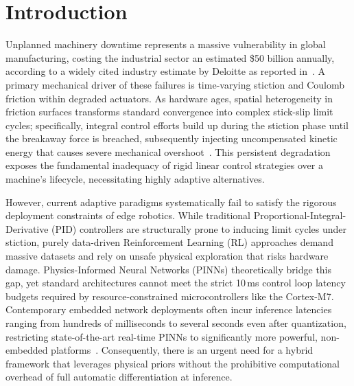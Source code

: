 \documentclass[11pt, a4paper]{article}
\begin{document}
\section{Introduction}

Unplanned machinery downtime represents a massive vulnerability in global
manufacturing, costing the industrial sector an estimated \$50 billion
annually, according to a widely cited industry estimate by Deloitte as
reported in~\citet{ojeda2025predictive}.
A primary mechanical driver of these failures is time-varying stiction and
Coulomb friction within degraded actuators.
As hardware ages, spatial heterogeneity in friction surfaces transforms
standard convergence into complex stick-slip limit cycles; specifically,
integral control efforts build up during the stiction phase until the
breakaway force is breached, subsequently injecting uncompensated kinetic
energy that causes severe mechanical
overshoot~\citep{ruderman2025convergenceanalysisfeedbackcontrol,
                 PhysRevE.111.055505}.
This persistent degradation exposes the fundamental inadequacy of rigid
linear control strategies over a machine's lifecycle, necessitating highly
adaptive alternatives.

However, current adaptive paradigms systematically fail to satisfy the
rigorous deployment constraints of edge robotics.
While traditional Proportional-Integral-Derivative (PID) controllers are
structurally prone to inducing limit cycles under stiction, purely
data-driven Reinforcement Learning (RL) approaches demand massive datasets
and rely on unsafe physical exploration that risks hardware damage.
Physics-Informed Neural Networks (PINNs) theoretically bridge this gap,
yet standard architectures cannot meet the strict 10\,ms control loop
latency budgets required by resource-constrained microcontrollers like the
Cortex-M7.
Contemporary embedded network deployments often incur inference latencies
ranging from hundreds of milliseconds to several seconds even after
quantization, restricting state-of-the-art real-time PINNs to
significantly more powerful, non-embedded
platforms~\citep{Saha_2022, krasteva2025dnn, kim2026physicsinformedneuralnetworksrealtime}.
Consequently, there is an urgent need for a hybrid framework that leverages
physical priors without the prohibitive computational overhead of full
automatic differentiation at inference.
\end{document}
